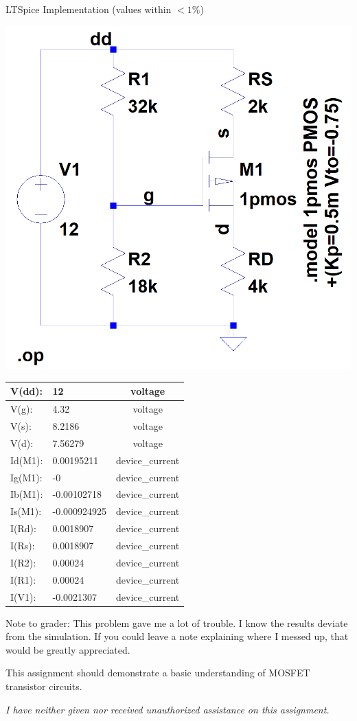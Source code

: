\documentclass[12pt,letterpaper,titlepage]{article}
\begin{document}
\begin{raggedright}
\begin{center}
LTSpice Implementation (values within $<1\%$)
\begin{paracol}{2}
\includegraphics[width=.5\textwidth, height=\textheight, keepaspectratio=true]{ds2b}
\switchcolumn
\begin{tabular}{|l|l|c|}
  \hline V(dd):	& 12        	& voltage
\\\hline V(g):	& 4.32  	    & voltage
\\\hline V(s):	& 8.2186    	& voltage
\\\hline V(d):	& 7.56279   	& voltage
\\\hline Id(M1):& 0.00195211	& device\_current
\\\hline Ig(M1):& -0        	& device\_current
\\\hline Ib(M1):& -0.00102718	& device\_current
\\\hline Is(M1):& -0.000924925	& device\_current
\\\hline I(Rd):	& 0.0018907	    & device\_current
\\\hline I(Rs):	& 0.0018907	    & device\_current
\\\hline I(R2):	& 0.00024	    & device\_current
\\\hline I(R1):	& 0.00024	    & device\_current
\\\hline I(V1):	& -0.0021307	& device\_current
\\\hline
\end{tabular}
\end{paracol}
\end{center}

Note to grader: This problem gave me a lot of trouble. I know the results deviate from the simulation. If you could leave a note explaining where I messed up, that would be greatly appreciated.


This assignment should demonstrate a basic understanding of MOSFET transistor circuits.

\textit{I have neither given nor received unauthorized assistance on this assignment.}


\end{raggedright}
\end{document}
